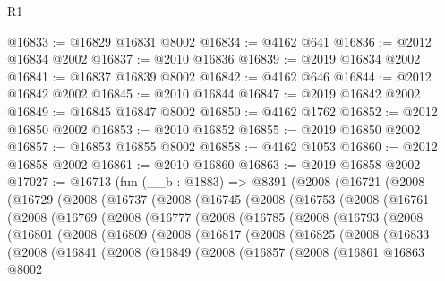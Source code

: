 \begin{lexlean}{R1}
\begin{coremodule}
@16833 := @16829 @16831 @8002
@16834 := @4162 @641
@16836 := @2012 @16834 @2002
@16837 := @2010 @16836
@16839 := @2019 @16834 @2002
@16841 := @16837 @16839 @8002
@16842 := @4162 @646
@16844 := @2012 @16842 @2002
@16845 := @2010 @16844
@16847 := @2019 @16842 @2002
@16849 := @16845 @16847 @8002
@16850 := @4162 @1762
@16852 := @2012 @16850 @2002
@16853 := @2010 @16852
@16855 := @2019 @16850 @2002
@16857 := @16853 @16855 @8002
@16858 := @4162 @1053
@16860 := @2012 @16858 @2002
@16861 := @2010 @16860
@16863 := @2019 @16858 @2002
@17027 := @16713
    (fun (__b : @1883) =>
    @8391
      (@2008
        (@16721
          (@2008
            (@16729
              (@2008
                (@16737
                  (@2008
                    (@16745
                      (@2008
                        (@16753
                          (@2008
                            (@16761
                              (@2008
                                (@16769
                                  (@2008
                                    (@16777
                                      (@2008
                                        (@16785
                                          (@2008
                                            (@16793
                                              (@2008
                                                (@16801
                                                  (@2008
                                                    (@16809
                                                      (@2008
                                                        (@16817
                                                          (@2008
                                                            (@16825
                                                              (@2008
                                                                (@16833
                                                                  (@2008
                                                                    (@16841
                                                                      (@2008
                                                                        (@16849
                                                                          (@2008
                                                                            (@16857
                                                                              (@2008
                                                                                (@16861
                                                                                  @16863
                                                                                  @8002

\end{coremodule}
\end{lexlean}
